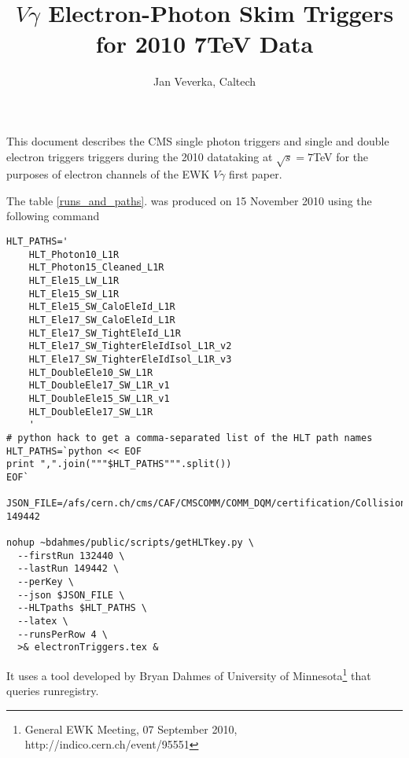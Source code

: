 \documentclass[a4paper,10pt]{article}
\title{$V\gamma$ Electron-Photon Skim Triggers for 2010 7TeV Data}
\author{Jan Veverka, Caltech}
\begin{document}
\maketitle
This document describes the CMS single photon triggers and single and double electron triggers triggers 
during the 2010 datataking at $\sqrt{s} = 7$TeV for the purposes of electron channels 
of the EWK $V\gamma$ first paper.

The table \ref{runs_and_paths}. was produced on 15 November 2010 using the following command
\begin{verbatim}
HLT_PATHS='
    HLT_Photon10_L1R
    HLT_Photon15_Cleaned_L1R
    HLT_Ele15_LW_L1R
    HLT_Ele15_SW_L1R
    HLT_Ele15_SW_CaloEleId_L1R
    HLT_Ele17_SW_CaloEleId_L1R
    HLT_Ele17_SW_TightEleId_L1R
    HLT_Ele17_SW_TighterEleIdIsol_L1R_v2
    HLT_Ele17_SW_TighterEleIdIsol_L1R_v3
    HLT_DoubleEle10_SW_L1R
    HLT_DoubleEle17_SW_L1R_v1
    HLT_DoubleEle15_SW_L1R_v1
    HLT_DoubleEle17_SW_L1R
    '
# python hack to get a comma-separated list of the HLT path names
HLT_PATHS=`python << EOF
print ",".join("""$HLT_PATHS""".split())
EOF`

JSON_FILE=/afs/cern.ch/cms/CAF/CMSCOMM/COMM_DQM/certification/Collisions10/7TeV/DCSOnly/DCSTRONLY_132440-149442

nohup ~bdahmes/public/scripts/getHLTkey.py \
  --firstRun 132440 \
  --lastRun 149442 \
  --perKey \
  --json $JSON_FILE \
  --HLTpaths $HLT_PATHS \
  --latex \
  --runsPerRow 4 \
  >& electronTriggers.tex &
\end{verbatim}
It uses a tool developed by Bryan Dahmes of University of Minnesota\footnote{General EWK Meeting, 07 September 2010, http://indico.cern.ch/event/95551} that queries runregistry.
\end{document}
